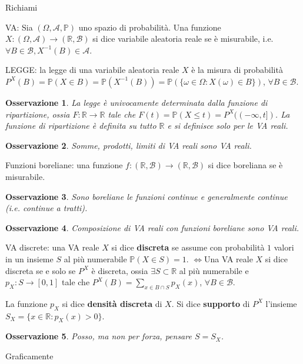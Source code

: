
\newtheorem*{oss}{Osservazione}
\newtheorem*{theorem}{Teorema}

Richiami

VA: Sia $( \Omega ,\mathcal{A} ,\mathbb{P})$ uno spazio di probabilità. Una funzione $X:( \Omega ,\mathcal{A})\rightarrow (\mathbb{R} ,\mathcal{B})$ si dice variabile aleatoria reale se è misurabile, i.e. $\forall B\in \mathcal{B} ,X^{-1}( B) \in \mathcal{A}$.

LEGGE: la legge di una variabile aleatoria reale $X$ è la misura di probabilità $P^{X}( B) =\mathbb{P}( X\in B) =\mathbb{P}\left( X^{-1}( B)\right) =\mathbb{P}(\{\omega \in \Omega :X( \omega ) \in B\})$, $\forall B\in \mathcal{B}$.
\begin{oss}
La legge è univocamente determinata dalla funzione di ripartizione, ossia $F:\mathbb{R}\rightarrow \mathbb{R}$ tale che $F( t) =\mathbb{P}( X\leq t) =P^{X}(( -\infty ,t])$. La funzione di ripartizione è definita su tutto $\mathbb{R}$ e si definisce solo per le VA reali.
\end{oss}
\begin{oss}
Somme, prodotti, limiti di VA reali sono VA reali.
\end{oss}
Funzioni boreliane: una funzione $f:(\mathbb{R} ,\mathcal{B})\rightarrow (\mathbb{R} ,\mathcal{B})$ si dice boreliana se è misurabile.
\begin{oss}
Sono boreliane le funzioni continue e generalmente continue (i.e. continue a tratti).
\end{oss}
\begin{oss}
Composizione di VA reali con funzioni boreliane sono VA reali.
\end{oss}
VA discrete: una VA reale $X$ si dice \textbf{discreta} se assume con probabilità $1$ valori in un insieme $S$ al più numerabile $\mathbb{P}( X\in S) =1$. $\iff $Una VA reale $X$ si dice discreta se e solo se $P^{X}$ è discreta, ossia $\exists S\subset \mathbb{R}$ al più numerabile e $p_{X} :S\rightarrow [ 0,1]$ tale che $P^{X}( B) =\sum\limits _{x\in B\cap S} p_{X}( x)$, $\forall B\in \mathcal{B}$.

La funzione $p_{X}$ si dice \textbf{densità discreta} di $X$. Si dice \textbf{supporto} di $P^{X}$ l'insieme $S_{X} =\{x\in \mathbb{R} :p_{X}( x)  >0\}$.
\begin{oss}
Posso, ma non per forza, pensare $S=S_{X}$.
\end{oss}
Graficamente




